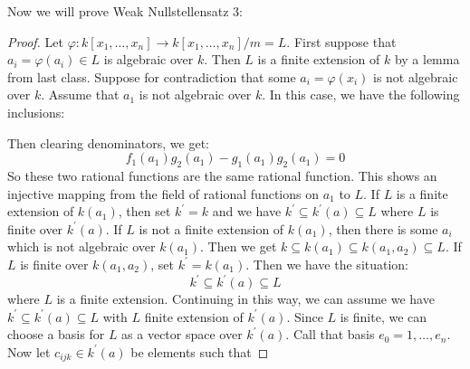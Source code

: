 \documentclass{report}
\begin{document}
Now we will prove Weak Nullstellensatz 3:
    \begin{proof}
        Let $\varphi : k[x_{1}, \ldots , x_{n}] \rightarrow k[x_{1}, \ldots , x_{n}]/m = L$. First suppose that $a_{i} = \varphi(a_{i}) \in L$ is algebraic over $k$. Then $L$ is a finite extension of $k$ by a lemma from last class. Suppose for contradiction that some $a_{i} = \varphi(x_{i})$ is not algebraic over $k$. Assume that $a_{1}$ is not algebraic over $k$. In this case, we have the following inclusions: 
            \begin{center}
            \end{center}
        Then clearing denominators, we get:
            \begin{equation*}
                f_{1}(a_{1})g_{2}(a_{1}) - g_{1}(a_{1})g_{2}(a_{1}) = 0
            \end{equation*}
        So these two rational functions are the same rational function. This shows an injective mapping from the field of rational functions on $a_{1}$ to $L$. If $L$ is  a finite extension of $k(a_{1})$, then set $k^{\prime} = k$ and we have $k^{\prime} \subseteq k^{\prime}(a) \subseteq L$ where $L$ is finite over $k^{\prime}(a)$. If $L$ is not a finite extension of $k(a_{1})$, then there is some $a_{i}$ which is not algebraic over $k(a_{1})$. Then we get $k \subseteq k(a_{1}) \subseteq k(a_{1}, a_{2}) \subseteq L$. If $L$ is finite over $k(a_{1}, a_{2})$, set $k^{\prime} = k(a_{1})$. Then we have the situation:
            \begin{equation*}
                k^{\prime} \subseteq k^{\prime}(a) \subseteq L
            \end{equation*}
        where $L$ is a finite extension. Continuing in this way, we can assume we have $k^{\prime} \subseteq k^{\prime}(a) \subseteq L$ with $L$ finite extension of $k^{\prime}(a)$. Since $L$ is finite, we can choose a basis for $L$ as a vector space over $k^{\prime}(a)$.  Call that basis $e_{0} = 1, \ldots , e_{n}$. Now let $c_{ijk} \in k^{\prime}(a)$ be elements such that

\end{proof}
\end{document}
